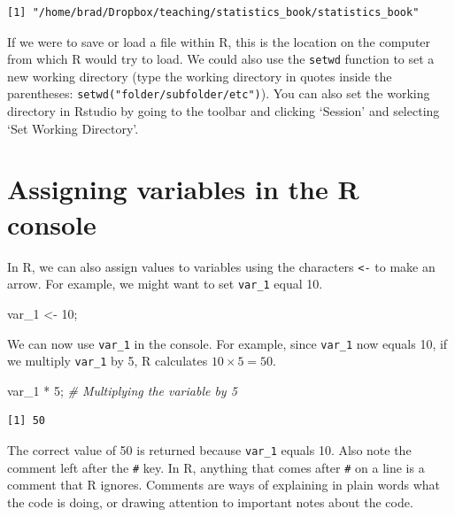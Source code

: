 \documentclass[
]{scrbook}
\newenvironment{Shaded}{\begin{snugshade}}{\end{snugshade}}
\newcommand{\CommentTok}[1]{\textcolor[rgb]{0.56,0.35,0.01}{\textit{#1}}}
\newcommand{\DecValTok}[1]{\textcolor[rgb]{0.00,0.00,0.81}{#1}}
\newcommand{\NormalTok}[1]{#1}
\newcommand{\OtherTok}[1]{\textcolor[rgb]{0.56,0.35,0.01}{#1}}
\newcommand{\SpecialCharTok}[1]{\textcolor[rgb]{0.00,0.00,0.00}{#1}}
\begin{document}
\begin{verbatim}
[1] "/home/brad/Dropbox/teaching/statistics_book/statistics_book"
\end{verbatim}

If we were to save or load a file within R, this is the location on the computer from which R would try to load.
We could also use the \texttt{setwd} function to set a new working directory (type the working directory in quotes inside the parentheses: \texttt{setwd("folder/subfolder/etc")}).
You can also set the working directory in Rstudio by going to the toolbar and clicking `Session' and selecting `Set Working Directory'.

\hypertarget{assigning-variables-in-the-r-console}{%
\section{Assigning variables in the R console}\label{assigning-variables-in-the-r-console}}

In R, we can also assign values to variables using the characters \texttt{\textless{}-} to make an arrow.
For example, we might want to set \texttt{var\_1} equal 10.

\begin{Shaded}
\begin{Highlighting}[]
\NormalTok{var\_1 }\OtherTok{\textless{}{-}} \DecValTok{10}\NormalTok{;}
\end{Highlighting}
\end{Shaded}

We can now use \texttt{var\_1} in the console.
For example, since \texttt{var\_1} now equals 10, if we multiply \texttt{var\_1} by 5, R calculates \(10 \times 5 = 50\).

\begin{Shaded}
\begin{Highlighting}[]
\NormalTok{var\_1 }\SpecialCharTok{*} \DecValTok{5}\NormalTok{; }\CommentTok{\# Multiplying the variable by 5}
\end{Highlighting}
\end{Shaded}

\begin{verbatim}
[1] 50
\end{verbatim}

The correct value of 50 is returned because \texttt{var\_1} equals 10. Also note the comment left after the \texttt{\#} key.
In R, anything that comes after \texttt{\#} on a line is a comment that R ignores.
Comments are ways of explaining in plain words what the code is doing, or drawing attention to important notes about the code.
\end{document}
